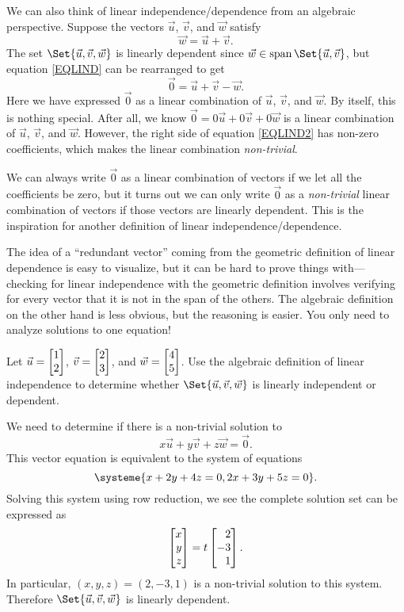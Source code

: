 We can also think of linear independence/dependence from an algebraic perspective.
Suppose the vectors $\vec u$, $\vec v$, and $\vec w$ satisfy 
\begin{equation}
	\label{EQLIND}
	\vec w=\vec u+\vec v.
\end{equation}
The set
$\Set{\vec u,\vec v,\vec w}$ is linearly dependent since $\vec w\in\Span\Set{\vec u,\vec v}$,
but equation \eqref{EQLIND} can be rearranged
to get
\begin{equation}
	\label{EQLIND2}
	\vec 0=\vec u+\vec v-\vec w.
\end{equation}
Here we have expressed $\vec 0$ as a linear combination of $\vec u$, $\vec v$, and $\vec w$.
By itself, this is nothing special. After all, we know $\vec 0=0\vec u+0\vec v+0\vec w$
is a linear combination of $\vec u$, $\vec v$, and $\vec w$. However, the right side of equation \eqref{EQLIND2} has non-zero
coefficients, which makes the linear combination \emph{non-trivial}.


We can always write $\vec 0$ as a linear combination of vectors if we let all the coefficients
be zero, but it turns out we can only write $\vec 0$ as a \emph{non-trivial} linear combination
of vectors if those vectors are linearly dependent. This is the inspiration for another definition
of linear independence/dependence.


The idea of a ``redundant vector'' coming from the geometric definition of linear dependence
is easy to visualize, but it can be hard to prove things with---checking for linear independence
with the geometric definition involves verifying for every vector that it is not in the span of the others.
The algebraic definition on the other hand is less obvious, but the reasoning is easier.
You only need to analyze solutions to one equation!

\begin{example}
	Let $\vec u=\mat{1\\2}$, $\vec v=\mat{2\\3}$, and $\vec w=\mat{4\\5}$. Use the algebraic definition
	of linear independence to determine whether
	$\Set{\vec u,\vec v,\vec w}$ is linearly independent or dependent.

	We need to determine if there is a non-trivial solution to 
	\[
		x\vec u+y\vec v+z\vec w=\vec 0.
	\]
	This vector equation is equivalent to the system of equations
	\[
		\systeme{x+2y+4z=0,2x+3y+5z=0}.
	\]
	Solving this system using row reduction, we see the complete solution set can be expressed as
	\[
		\mat{x\\y\\z}=t\mat{2\\-3\\1}.
	\]
	In particular, $(x,y,z)=(2,-3,1)$ is a non-trivial solution to this system. Therefore $\Set{\vec u,\vec v,\vec w}$
	is linearly dependent.
\end{example}


